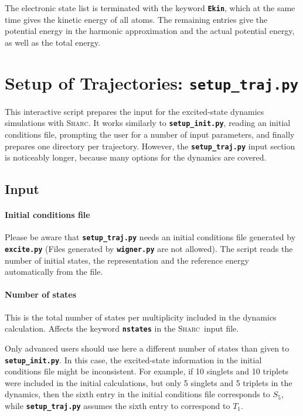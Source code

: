 \documentclass[a4paper,11pt,DIV=15,openany,twoside=false]{scrbook}
\newcommand{\sharc}{\textsc{Sharc}}
\newcommand{\ttt}[1]{\textbf{\texttt{#1}}}
\begin{document}
The electronic state list is terminated with the keyword \ttt{Ekin}, which at the same time gives the kinetic energy of all atoms. The remaining entries give the potential energy in the harmonic approximation and the actual potential energy, as well as the total energy.





\section{Setup of Trajectories: \ttt{setup\_traj.py}}\label{sec:setup_traj.py}

This interactive script prepares the input for the excited-state dynamics simulations with \sharc. It works similarly to \ttt{setup\_init.py}, reading an initial conditions file, prompting the user for a number of input parameters, and finally prepares one directory per trajectory. However, the \ttt{setup\_traj.py} input section is noticeably longer, because many options for the dynamics are covered.

\subsection{Input}

\paragraph{Initial conditions file}

Please be aware that \ttt{setup\_traj.py} needs an initial conditions file generated by \ttt{excite.py} (Files generated by \ttt{wigner.py} are not allowed). The script reads the number of initial states, the representation and the reference energy automatically from the file.

\paragraph{Number of states}

This is the total number of states per multiplicity included in the dynamics calculation. Affects the keyword \ttt{nstates} in the \sharc\ input file.

Only advanced users should use here a different number of states than given to \ttt{setup\_init.py}. In this case, the excited-state information in the initial conditions file might be inconsistent. For example, if 10 singlets and 10 triplets were included in the initial calculations, but only 5 singlets and 5 triplets in the dynamics, then the sixth entry in the initial conditions file corresponds to $S_5$, while \ttt{setup\_traj.py} assumes the sixth entry to correspond to $T_1$.
\end{document}
